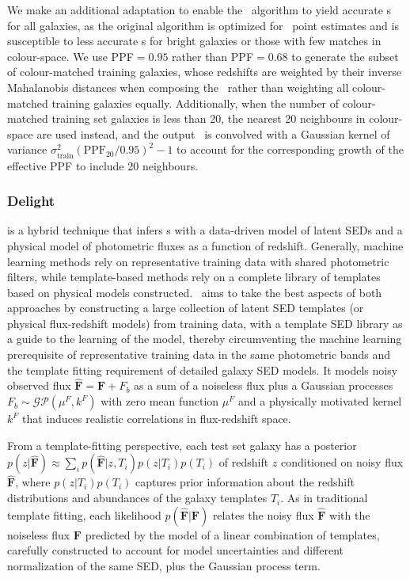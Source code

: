 We make an additional adaptation to enable the \cmnn\ algorithm to yield accurate \pzpdf s for all galaxies, as the original \citet{Graham:17} algorithm is optimized for \pz\ point estimates and is susceptible to less accurate \pzpdf s for bright galaxies or those with few matches in colour-space.
We use PPF$=0.95$ rather than PPF$=0.68$ to generate the subset of colour-matched training galaxies, whose redshifts are weighted by their inverse Mahalanobis distances when composing the \pzpdf\ rather than weighting all colour-matched training galaxies equally.
Additionally, when the number of colour-matched training set galaxies is less than 20, the nearest 20 neighbours in colour-space are used instead, and the output \pzpdf\ is convolved with a Gaussian kernel of variance $\sigma_{\mathrm{ train}}^{2}(\mathrm{PPF}_{20}/0.95)^2 -1$ to account for the corresponding growth of the effective PPF to include 20 neighbours.

\subsubsection{Delight}
\label{sec:delight}

\delight \citep{Leistedt:17} is a hybrid technique that infers \pz s with a data-driven model of latent SEDs and a physical model of photometric fluxes as a function of redshift.
Generally, machine learning methods rely on representative training data with shared photometric filters, while template-based methods rely on a complete library of templates based on physical models constructed.
\delight\ aims to take the best aspects of both approaches by constructing a large collection of latent SED templates (or physical flux-redshift models) from training data, with a template SED library as a guide to the learning of the model, thereby circumventing the machine learning prerequisite of representative training data in the same photometric bands and the template fitting requirement of detailed galaxy SED models.
It models noisy observed flux $\mathbf{\hat{F}} = \mathbf{F} + F_{b}$ as a sum of a noiseless flux plus a Gaussian processes $F_b \sim \mathcal{GP}\left(\mu^F, k^F \right)$ with zero mean function $\mu^{F}$ and a physically motivated kernel $k^{F}$ that induces realistic correlations in flux-redshift space.

From a template-fitting perspective, each test set galaxy has a posterior $p(z \vert \mathbf{\hat{F}}) \approx \sum_i p(\mathbf{\hat{F}} \vert z, T_i) p(z \vert T_i) p(T_i)$ of redshift $z$ conditioned on noisy flux $\mathbf{\hat{F}}$, where $p(z \vert T_i) p(T_i)$ captures prior information about the redshift distributions and abundances of the galaxy templates $T_i$.
As in traditional template fitting, each likelihood $p(\mathbf{\hat{F}} \vert \mathbf{F})$ relates the noisy flux $\mathbf{\hat{F}}$ with the noiseless flux $\mathbf{F}$ predicted by the model of a linear combination of templates, carefully constructed to account for model uncertainties and different normalization of the same SED, plus the Gaussian process term.

